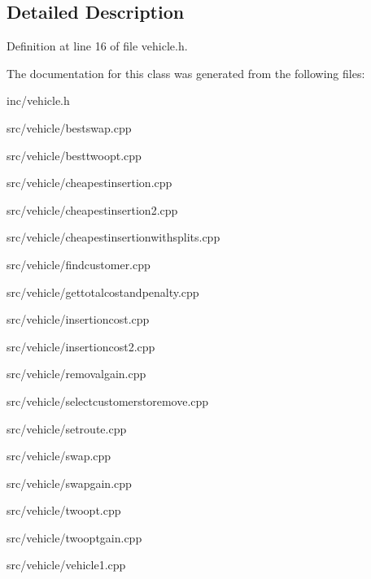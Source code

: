 \subsection{Detailed Description}


Definition at line 16 of file vehicle.\+h.



The documentation for this class was generated from the following files\+:\begin{DoxyCompactItemize}
\item 
inc/vehicle.\+h\item 
src/vehicle/bestswap.\+cpp\item 
src/vehicle/besttwoopt.\+cpp\item 
src/vehicle/cheapestinsertion.\+cpp\item 
src/vehicle/cheapestinsertion2.\+cpp\item 
src/vehicle/cheapestinsertionwithsplits.\+cpp\item 
src/vehicle/findcustomer.\+cpp\item 
src/vehicle/gettotalcostandpenalty.\+cpp\item 
src/vehicle/insertioncost.\+cpp\item 
src/vehicle/insertioncost2.\+cpp\item 
src/vehicle/removalgain.\+cpp\item 
src/vehicle/selectcustomerstoremove.\+cpp\item 
src/vehicle/setroute.\+cpp\item 
src/vehicle/swap.\+cpp\item 
src/vehicle/swapgain.\+cpp\item 
src/vehicle/twoopt.\+cpp\item 
src/vehicle/twooptgain.\+cpp\item 
src/vehicle/vehicle1.\+cpp\end{DoxyCompactItemize}

